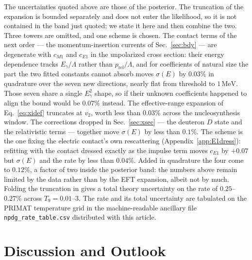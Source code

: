 \documentclass[
  aps,prd,twocolumn,nofootinbib,superscriptaddress,
  longbibliography,floatfix,preprintnumbers
]{revtex4-2}
\newcommand{\prel}{p_{\mathrm{rel}}}
\newcommand{\Egam}{E_{\gamma}}
\newcommand{\Mone}{M1}
\newcommand{\Eone}{E1}
\begin{document}
The uncertainties quoted above are those of the posterior. The truncation of the
expansion is bounded separately and does not enter the likelihood, so it is not
contained in the band just quoted; we state it here and then combine the two.
Three towers are omitted, and one scheme is chosen. The contact terms of the next order --- the
momentum-insertion currents of Sec.~\ref{sec:bdy} --- are degenerate with
$c_{\Mone}$ and $c_{\Eone}$ in the unpolarized cross section: their energy
dependence tracks $\Egam/\Lambda$ rather than $\prel/\Lambda$, and for coefficients
of natural size the part the two fitted constants cannot absorb moves $\sigma(E)$
by $0.03\%$ in quadrature over the seven new directions, nearly flat from threshold
to $1\,\mathrm{MeV}$. Those seven share a single $\Egam^{2}$ shape, so if their
unknown coefficients happened to align the bound would be $0.07\%$ instead. The
effective-range expansion of Eq.~\eqref{eq:xidef} truncates at $v_{2}$, worth less
than $0.03\%$ across the nucleosynthesis window. The corrections dropped in
Sec.~\ref{sec:xsec} --- the deuteron $D$ state and the relativistic terms ---
together move $\sigma(E)$ by less than $0.1\%$. The scheme is the one fixing the
electric contact's own rescattering (Appendix~\ref{app:E1dress}): refitting with
the contact dressed exactly as the impulse term moves $c_{\Eone}$ by $+0.07$ but
$\sigma(E)$ and the rate by less than $0.04\%$. Added in quadrature the four come
to $0.12\%$, a factor of two inside the posterior band: the numbers above remain limited by the data rather than by the
EFT expansion, albeit not by much. Folding the truncation in gives a total theory
uncertainty on the rate of $0.25$--$0.27\%$ across $T_{9}=0.01$--$3$. The rate
and its total uncertainty are tabulated on the PRIMAT temperature grid in the
machine-readable ancillary file \texttt{npdg\_rate\_table.csv} distributed with
this article.

\section{Discussion and Outlook}
\label{sec:discussion}
\end{document}

